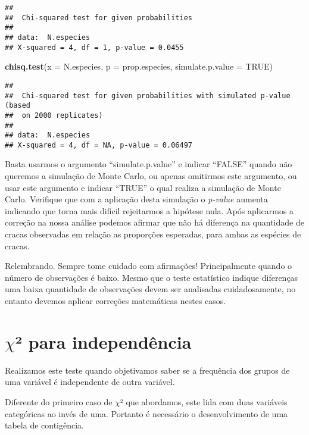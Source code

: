\documentclass[14pt,titlepage, oneside, openany, a4paper]{book}
\newenvironment{Shaded}{\begin{snugshade}}{\end{snugshade}}
\newcommand{\DataTypeTok}[1]{\textcolor[rgb]{0.13,0.29,0.53}{#1}}
\newcommand{\KeywordTok}[1]{\textcolor[rgb]{0.13,0.29,0.53}{\textbf{#1}}}
\newcommand{\NormalTok}[1]{#1}
\newcommand{\OtherTok}[1]{\textcolor[rgb]{0.56,0.35,0.01}{#1}}
\begin{document}
\begin{verbatim}
## 
##  Chi-squared test for given probabilities
## 
## data:  N.especies
## X-squared = 4, df = 1, p-value = 0.0455
\end{verbatim}

\begin{Shaded}
\begin{Highlighting}[]
\KeywordTok{chisq.test}\NormalTok{(}\DataTypeTok{x =}\NormalTok{ N.especies, }\DataTypeTok{p =}\NormalTok{ prop.especies, }\DataTypeTok{simulate.p.value =} \OtherTok{TRUE}\NormalTok{)}
\end{Highlighting}
\end{Shaded}

\begin{verbatim}
## 
##  Chi-squared test for given probabilities with simulated p-value (based
##  on 2000 replicates)
## 
## data:  N.especies
## X-squared = 4, df = NA, p-value = 0.06497
\end{verbatim}

Basta usarmos o argumento ``simulate.p.value'' e indicar ``FALSE'' quando não queremos a simulação de Monte Carlo, ou apenas omitirmos este argumento, ou usar este argumento e indicar ``TRUE'' o qual realiza a simulação de Monte Carlo. Verifique que com a aplicação desta simulação o \emph{p-value} aumenta indicando que torna mais dificil rejeitarmos a hipótese nula. Após aplicarmos a correção na nossa análise podemos afirmar que não há diferença na quantidade de cracas observadas em relação as proporções esperadas, para ambas as espécies de cracas.

Relembrando. Sempre tome cuidado com afirmações! Principalmente quando o número de observações é baixo. Mesmo que o teste estatístico indique diferenças uma baixa quantidade de observações devem ser analisadas cuidadosamente, no entanto devemos aplicar correções matemáticas nestes casos.

\hypertarget{chi-para-independuxeancia}{%
\section{\texorpdfstring{\(\chi\)² para independência}{\textbackslash{}chi² para independência}}\label{chi-para-independuxeancia}}

Realizamos este teste quando objetivamos saber se a frequência dos grupos de uma variável é independente de outra variável.

Diferente do primeiro caso de \(\chi\)² que abordamos, este lida com duas variáveis categóricas ao invés de uma. Portanto é necessário o desenvolvimento de uma tabela de contigência.
\end{document}
